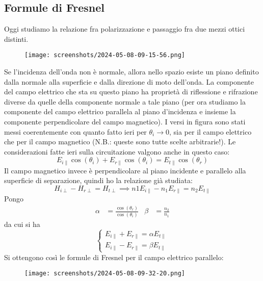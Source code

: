 \subsection{Formule di Fresnel}
Oggi studiamo la relazione fra polarizzazione e passaggio fra due mezzi ottici distinti.
\begin{figure}[H]
	\centering
	\texttt{[image: screenshots/2024-05-08-09-15-56.png]}
\end{figure}
Se l'incidenza dell'onda non è normale, allora nello spazio esiste un piano definito dalla normale alla superficie e dalla direzione di moto dell'onda. La componente del campo elettrico che sta su questo piano ha proprietà di riflessione e rifrazione diverse da quelle della componente normale a tale piano (per ora studiamo la componente del campo elettrico parallela al piano d'incidenza e insieme la componente perpendicolare del campo magnetico). I versi in figura sono stati messi coerentemente con quanto fatto ieri per \(\theta _i \to 0\), sia per il campo elettrico che per il campo magnetico (N.B.: queste sono tutte scelte arbitrarie!).
Le considerazioni fatte ieri sulla circuitazione valgono anche in questo caso:
\begin{equation}
	E_{i \parallel} \cos (\theta _i) + E_{r \parallel} \cos (\theta _i) = E_{t \parallel} \cos (\theta _r)
\end{equation}
Il campo magnetico invece è perpendicolare al piano incidente e parallelo alla superficie di separazione, quindi ho la relazione già studiata:
\begin{equation}
	H_{i \perp } - H_{r \perp } = H_{t \perp } \implies n1 E_{i \parallel} - n_1 E_{r \parallel} = n_2 E_{t \parallel}
\end{equation}
Pongo
\begin{align}
	\alpha &= \frac{\cos (\theta _r)}{\cos (\theta _i)} &
	\beta &= \frac{n_2}{n_1}
\end{align}
da cui si ha
\begin{equation}
	\begin{cases}
		E_{i \parallel} + E_{r \parallel} = \alpha E_{t \parallel}\\
		E_{i \parallel} - E_{r \parallel} = \beta E_{t \parallel}	
	\end{cases}
\end{equation}
Si ottengono così le formule di Fresnel per il campo elettrico parallelo:
\begin{figure}[H]
	\centering
	\texttt{[image: screenshots/2024-05-08-09-32-20.png]}
\end{figure}

